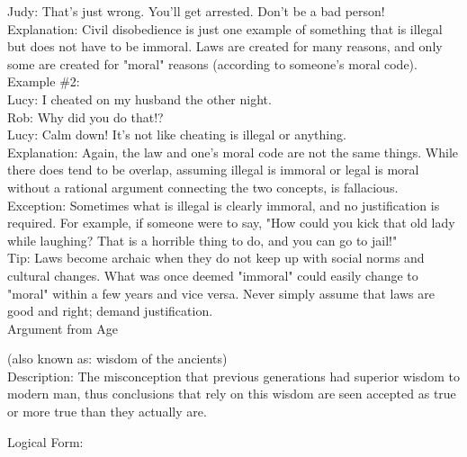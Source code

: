 \documentclass[a4paper,12pt,single,pdftex]{scrartcl}
\begin{document}
    
      Judy: That's just wrong. You'll get arrested. Don't be a bad person!
    \\

    
      Explanation: Civil disobedience is just one example of something that is illegal but does not have to be immoral. Laws are created for many reasons, and only some are created for "moral" reasons (according to someone's moral code).
    \\

    
      Example \#2:
    \\

    
      Lucy: I cheated on my husband the other night.
    \\

    
      Rob: Why did you do that!?
    \\

    
      Lucy: Calm down! It's not like cheating is illegal or anything.
    \\

    
      Explanation: Again, the law and one's moral code are not the same things. While there does tend to be overlap, assuming illegal is immoral or legal is moral without a rational argument connecting the two concepts, is fallacious.
    \\

    
      Exception: Sometimes what is illegal is clearly immoral, and no justification is required. For example, if someone were to say, "How could you kick that old lady while laughing? That is a horrible thing to do, and you can go to jail!"
    \\

    
      Tip: Laws become archaic when they do not keep up with social norms and cultural changes. What was once deemed "immoral" could easily change to "moral" within a few years and vice versa. Never simply assume that laws are good and right; demand justification.
    \\

  

Argument from Age
    
      (also known as: wisdom of the ancients)
    \\

  
    Description: The misconception that previous generations had superior wisdom to modern man, thus conclusions that rely on this wisdom are seen accepted as true or more true than they actually are.

    
      Logical Form:
    \\
\end{document}

